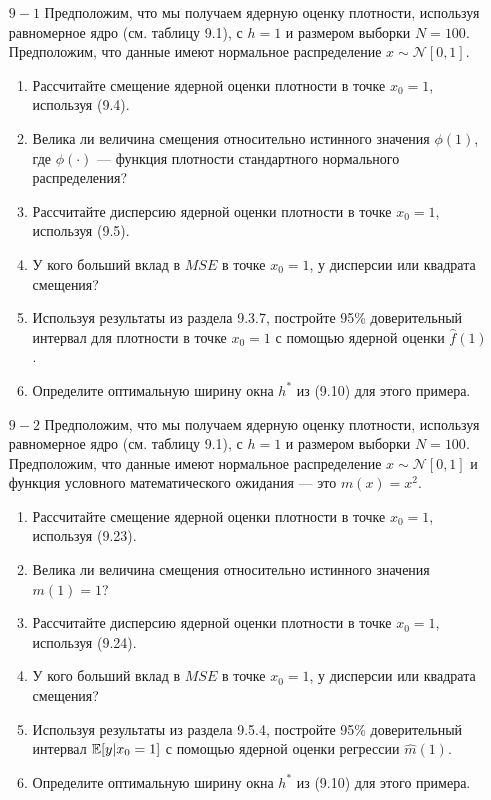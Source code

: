 \begin{enumerate}
\item [$9 - 1$] Предположим, что мы получаем ядерную оценку плотности, используя равномерное ядро (см. таблицу 9.1), с $h = 1$ и размером выборки $N = 100$. Предположим, что данные имеют нормальное распределение $x \sim \mathcal{N}[0,1]$.
\begin{enumerate}
\item Рассчитайте смещение ядерной оценки плотности в точке $x_0 = 1$, используя (9.4).
\item Велика ли величина смещения относительно истинного значения $\phi(1)$, где $\phi(\cdot)$ --- функция плотности стандартного нормального распределения?
\item Рассчитайте дисперсию ядерной оценки плотности в точке $x_0 = 1$, используя (9.5).
\item У кого больший вклад в $MSE$ в точке $x_0 = 1$, у дисперсии или квадрата смещения?
\item Используя результаты из раздела 9.3.7, постройте 95\% доверительный интервал для плотности в точке $x_0 = 1$ с помощью ядерной оценки $\hat{f}(1)$.
\item Определите оптимальную ширину окна $h^*$ из (9.10) для этого примера.
\end{enumerate}
\item [$9 - 2$] Предположим, что мы получаем ядерную оценку плотности, используя равномерное ядро (см. таблицу 9.1), с $h = 1$ и размером выборки $N = 100$. Предположим, что данные имеют нормальное распределение $x \sim \mathcal{N}[0,1]$ и функция условного математического ожидания --- это $m(x) = x^2$.
\begin{enumerate}
\item Рассчитайте смещение ядерной оценки плотности в точке $x_0 = 1$, используя (9.23).
\item Велика ли величина смещения относительно истинного значения $m(1) = 1$?
\item Рассчитайте дисперсию ядерной оценки плотности в точке $x_0 = 1$, используя (9.24).
\item У кого больший вклад в $MSE$ в точке $x_0 = 1$, у дисперсии или квадрата смещения?
\item Используя результаты из раздела 9.5.4, постройте 95\% доверительный интервал $\mathbb{E}[y|x_0 = 1]$ с помощью ядерной оценки регрессии $\hat{m}(1)$.
\item Определите оптимальную ширину окна $h^*$ из (9.10) для этого примера.
\end{enumerate}

\end{enumerate}
